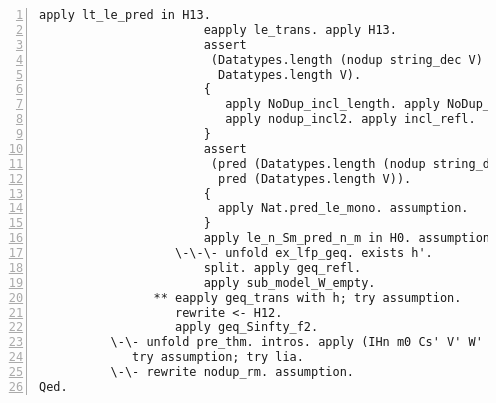 \begin{lstlisting}[language=Coq, label={lst:thm32}, caption={Full proof of Theorem 3.2 in Coq}, numbers=left]
                       apply lt_le_pred in H13.
                       eapply le_trans. apply H13.
                       assert
                        (Datatypes.length (nodup string_dec V) <=
                         Datatypes.length V).
                       {
                          apply NoDup_incl_length. apply NoDup_nodup.
                          apply nodup_incl2. apply incl_refl.
                       }
                       assert
                        (pred (Datatypes.length (nodup string_dec V)) <=
                         pred (Datatypes.length V)).
                       {
                         apply Nat.pred_le_mono. assumption.
                       }
                       apply le_n_Sm_pred_n_m in H0. assumption.
                   \-\-\- unfold ex_lfp_geq. exists h'.
                       split. apply geq_refl.
                       apply sub_model_W_empty.
                ** eapply geq_trans with h; try assumption.
                   rewrite <- H12.
                   apply geq_Sinfty_f2.
          \-\- unfold pre_thm. intros. apply (IHn m0 Cs' V' W' f');
             try assumption; try lia.
          \-\- rewrite nodup_rm. assumption.
Qed.
\end{lstlisting}
